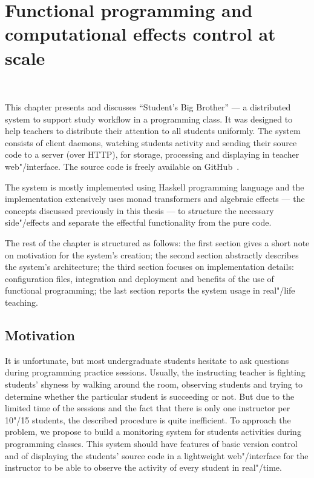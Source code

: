 \chapter{Functional programming and computational effects control at scale}
~\label{cpt-effects}

This chapter presents and discusses ``Student's Big Brother'' --- a distributed
system to support study workflow in a programming class. It was designed to help
teachers to distribute their attention to all students uniformly. The system consists
of client daemons, watching students activity and sending their source code to a server (over HTTP),
for storage, processing and displaying in teacher web"/interface.
The source code is freely available on GitHub~\cite{sbbRepo}.

The system is mostly implemented using Haskell programming language and the implementation
extensively uses monad transformers and algebraic effects --- the concepts discussed previously
in this thesis --- to structure the necessary side"/effects and separate the effectful
functionality from the pure code.

The rest of the chapter is structured as follows: the first section gives a short
note on motivation for the system's creation; the second section abstractly describes
the system's architecture; the third section focuses on implementation details:
configuration files, integration and deployment and benefits of the use of functional
programming; the last section reports the system usage in real"/life teaching.

\section{Motivation}

It is unfortunate, but most undergraduate students hesitate to ask questions during
programming practice sessions. Usually, the instructing teacher is fighting
students' shyness by walking around the room, observing students and trying to
determine whether the particular student is succeeding or not. But due to the
limited time of the sessions and the fact that there is only one instructor per
10"/15 students, the described procedure is quite inefficient. To approach the
problem, we propose to build a monitoring system for students activities during
programming classes. This system should have features of basic
version control and of displaying the students' source code in a lightweight
web"/interface for the instructor to be able to observe the activity of every
student in real"/time.

